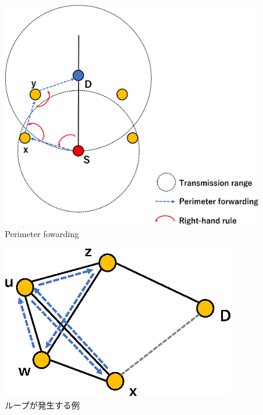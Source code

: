 \documentclass[10pt]{jreport}
\begin{document}
\begin{figure}[!ht]
	\centering
	\includegraphics[width=130mm]{figures/Perimeter.eps}
	\caption{Perimeter fowarding}
	\label{fig:Perimeter}
\end{figure}

\begin{figure}[!ht]
	\centering
	\includegraphics[width=100mm]{figures/cross-link.eps}
	\caption{ループが発生する例}
	\label{fig:cross_link}
\end{figure}
\end{document}
